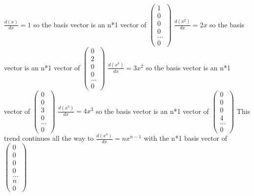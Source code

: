 \documentclass[12pt]{article}
\begin{document}
\newline
\newline
$\frac{d(x)}{dx} = 1$ so the basis vector is an n*1 vector of $\left(\begin{array}{c} 1  \\ 0 \\ 0 \\ 0 \\ ... \\ 0  \end{array}\right)$ 
\newline
\newline
$\frac{d(x^{2})}{dx} = 2x$ so the basis vector is an n*1 vector of $\left(\begin{array}{c} 0 \\ 2 \\ 0 \\ 0 \\ ... \\ 0  \end{array}\right)$ 
\newline
\newline
$\frac{d(x^{3})}{dx} = 3x^{2}$ so the basis vector is an n*1 vector of $\left(\begin{array}{c} 0  \\ 0 \\ 3 \\ 0 \\ ... \\ 0  \end{array}\right)$ 
\newline
\newline
$\frac{d(x^{4})}{dx} = 4x^{3}$ so the basis vector is an n*1 vector of $\left(\begin{array}{c} 0  \\ 0 \\ 0 \\ 4 \\ ... \\ 0  \end{array}\right)$ 
\newline
This trend continues all the way to $\frac{d(x^{n})}{dx} = nx^{n-1}$ with the n*1 basis vector of $\left(\begin{array}{c} 0  \\ 0 \\ 0 \\ 0 \\ ... \\ n \\ 0  \end{array}\right)$ 
\end{document}
